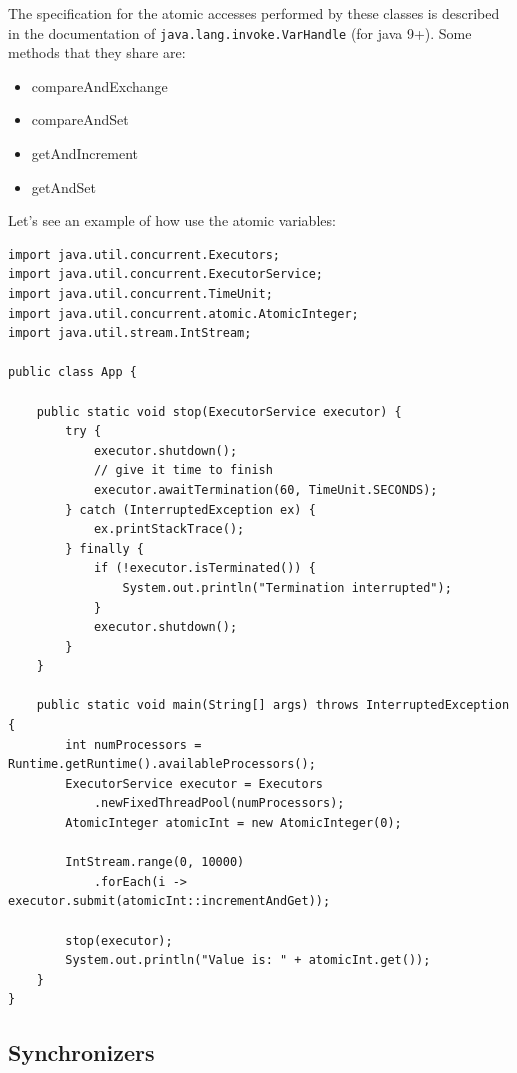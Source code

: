 \documentclass{latex/classes/thesis}
\begin{document}
The specification for the atomic accesses performed by these classes is
described in the documentation of \texttt{java.lang.invoke.VarHandle} (for java
9+). Some methods that they share are:

\begin{itemize}
\item compareAndExchange
\item compareAndSet
\item getAndIncrement
\item getAndSet
\end{itemize}

Let's see an example of how use the atomic variables:

\begin{lstlisting}
import java.util.concurrent.Executors;
import java.util.concurrent.ExecutorService;
import java.util.concurrent.TimeUnit;
import java.util.concurrent.atomic.AtomicInteger;
import java.util.stream.IntStream;

public class App {

    public static void stop(ExecutorService executor) {
        try {
            executor.shutdown();
            // give it time to finish
            executor.awaitTermination(60, TimeUnit.SECONDS);
        } catch (InterruptedException ex) {
            ex.printStackTrace();
        } finally {
            if (!executor.isTerminated()) {
                System.out.println("Termination interrupted");
            }
            executor.shutdown();
        }
    }

    public static void main(String[] args) throws InterruptedException {
        int numProcessors = Runtime.getRuntime().availableProcessors();
        ExecutorService executor = Executors
            .newFixedThreadPool(numProcessors);
        AtomicInteger atomicInt = new AtomicInteger(0);

        IntStream.range(0, 10000)
            .forEach(i -> executor.submit(atomicInt::incrementAndGet));

        stop(executor);
        System.out.println("Value is: " + atomicInt.get());
    }
}
\end{lstlisting}


\subsection{Synchronizers}
\label{sec:org30f5f8a}
\end{document}
